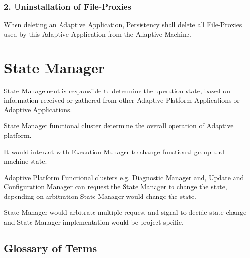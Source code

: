 \subsubsection*{2. Uninstallation of File-\/\+Proxies}


\begin{DoxyItemize}
\item When deleting an Adaptive Application, Persistency shall delete all File-\/\+Proxies used by this Adaptive Application from the Adaptive Machine. 
\end{DoxyItemize}\hypertarget{adaptive_state_manager}{}\section{State Manager}\label{adaptive_state_manager}

\begin{DoxyItemize}
\item State Management is responsible to determine the operation state, based on information received or gathered from other Adaptive Platform Applications or Adaptive Applications.
\item State Manager functional cluster determine the overall operation of Adaptive platform.
\item It would interact with Execution Manager to change functional group and machine state.
\item Adaptive Platform Functional clusters e.\+g. Diagnostic Manager and, Update and Configuration Manager can request the State Manager to change the state, depending on arbitration State Manager would change the state.
\item State Manager would arbitrate multiple request and signal to decide state change and State Manager implementation would be project spcific.
\end{DoxyItemize}

\subsection*{Glossary of Terms}

